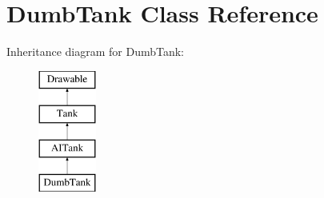 \hypertarget{class_dumb_tank}{}\section{Dumb\+Tank Class Reference}
\label{class_dumb_tank}
Inheritance diagram for Dumb\+Tank\+:\begin{figure}[H]
\begin{center}
\leavevmode
\includegraphics[height=4.000000cm]{class_dumb_tank}
\end{center}
\end{figure}
